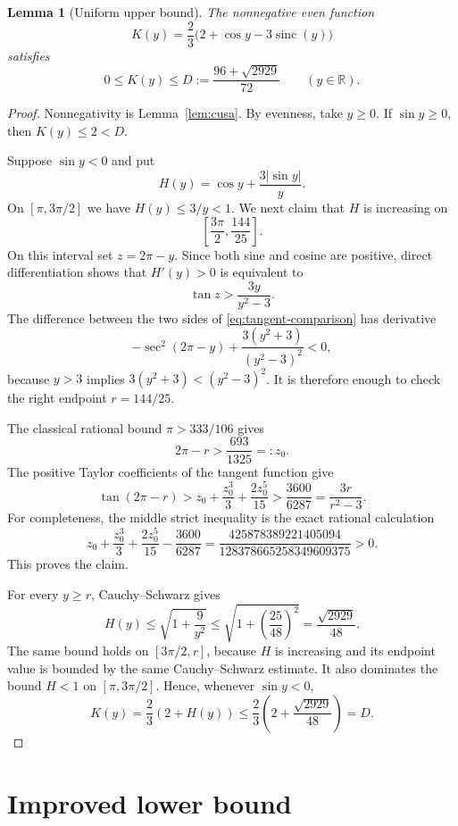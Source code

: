\documentclass[11pt]{article}
\newtheorem{lemma}[theorem]{Lemma}
\newcommand{\R}{\mathbb R}
\newcommand{\sinc}{\operatorname{sinc}}
\begin{document}
\begin{lemma}[Uniform upper bound]\label{lem:upper}
The nonnegative even function
\[
 K(y)=\frac23\bigl(2+\cos y-3\sinc(y)\bigr)
\]
satisfies
\begin{equation}\label{eq:D}
 0\le K(y)\le D:=\frac{96+\sqrt{2929}}{72}
 \qquad(y\in\R).
\end{equation}
\end{lemma}

\begin{proof}
Nonnegativity is Lemma~\ref{lem:cusa}. By evenness, take $y\ge0$. If
$\sin y\ge0$, then $K(y)\le2<D$.

Suppose $\sin y<0$ and put
\[
 H(y)=\cos y+\frac{3|\sin y|}{y}.
\]
On $[\pi,3\pi/2]$ we have $H(y)\le3/y<1$. We next claim that $H$ is
increasing on
\[
                  \left[\frac{3\pi}{2},\frac{144}{25}\right].
\]
On this interval set $z=2\pi-y$. Since both sine and cosine are positive,
direct differentiation shows that $H'(y)>0$ is equivalent to
\begin{equation}\label{eq:tangent-comparison}
              \tan z>\frac{3y}{y^2-3}.
\end{equation}
The difference between the two sides of
\eqref{eq:tangent-comparison} has derivative
\[
 -\sec^2(2\pi-y)+\frac{3(y^2+3)}{(y^2-3)^2}<0,
\]
because $y>3$ implies $3(y^2+3)<(y^2-3)^2$. It is therefore enough to
check the right endpoint $r=144/25$.

The classical rational bound $\pi>333/106$ gives
\[
 2\pi-r>\frac{693}{1325}=:z_0.
\]
The positive Taylor coefficients of the tangent function give
\[
 \tan(2\pi-r)>z_0+\frac{z_0^3}{3}+\frac{2z_0^5}{15}
                    >\frac{3600}{6287}
                    =\frac{3r}{r^2-3}.
\]
For completeness, the middle strict inequality is the exact rational
calculation
\[
 z_0+\frac{z_0^3}{3}+\frac{2z_0^5}{15}-\frac{3600}{6287}
 =\frac{425878389221405094}{128378665258349609375}>0.
\]
This proves the claim.

For every $y\ge r$, Cauchy--Schwarz gives
\[
 H(y)\le\sqrt{1+\frac9{y^2}}
       \le\sqrt{1+\left(\frac{25}{48}\right)^2}
       =\frac{\sqrt{2929}}{48}.
\]
The same bound holds on $[3\pi/2,r]$, because $H$ is increasing and its
endpoint value is bounded by the same Cauchy--Schwarz estimate. It also
dominates the bound $H<1$ on $[\pi,3\pi/2]$. Hence, whenever $\sin y<0$,
\[
 K(y)=\frac23(2+H(y))
       \le\frac23\left(2+\frac{\sqrt{2929}}{48}\right)
       =D.
\]
\end{proof}

\section{Improved lower bound}
\end{document}
